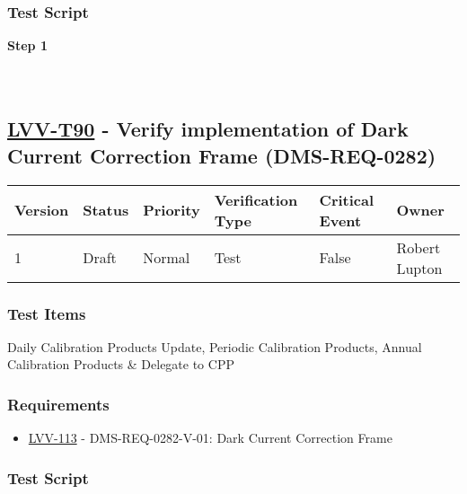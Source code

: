 \hypertarget{test-script-66}{%
\subsubsection{Test Script}\label{test-script-66}}

\textbf{Step 1}\\
~\\
~\\

\hypertarget{lvv-t90---verify-implementation-of-dark-current-correction-frame-dms-req-0282}{%
\subsection{\texorpdfstring{\href{https://jira.lsstcorp.org/secure/Tests.jspa\#/testCase/LVV-T90}{LVV-T90}
- Verify implementation of Dark Current Correction Frame
(DMS-REQ-0282)}{LVV-T90 - Verify implementation of Dark Current Correction Frame (DMS-REQ-0282)}}\label{lvv-t90---verify-implementation-of-dark-current-correction-frame-dms-req-0282}}

\begin{longtable}[]{@{}llllll@{}}
\toprule
Version & Status & Priority & Verification Type & Critical Event &
Owner\tabularnewline
\midrule
\endhead
1 & Draft & Normal & Test & False & Robert Lupton\tabularnewline
\bottomrule
\end{longtable}

\hypertarget{test-items-66}{%
\subsubsection{Test Items}\label{test-items-66}}

Daily Calibration Products Update, Periodic Calibration Products, Annual
Calibration Products \& Delegate to CPP

\hypertarget{requirements-67}{%
\subsubsection{Requirements}\label{requirements-67}}

\begin{itemize}
\tightlist
\item
  \href{https://jira.lsstcorp.org/browse/LVV-113}{LVV-113} -
  DMS-REQ-0282-V-01: Dark Current Correction Frame
\end{itemize}

\hypertarget{test-script-67}{%
\subsubsection{Test Script}\label{test-script-67}}

